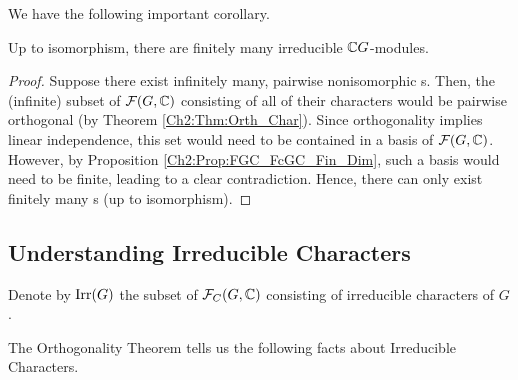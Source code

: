 We have the following important corollary.

\begin{corollary}
    Up to isomorphism, there are finitely many irreducible $\mathbb{C} G$-modules.
\end{corollary}
\begin{proof}
    Suppose there exist infinitely many, pairwise nonisomorphic \CGM s. Then, the (infinite) subset of $\mathcal{F}\!\left( G, \mathbb{C} \right)$ consisting of all of their characters would be pairwise orthogonal (by Theorem \ref{Ch2:Thm:Orth_Char}). Since orthogonality implies linear independence, this set would need to be contained in a basis of $\mathcal{F}\!\left( G, \mathbb{C} \right)$. However, by Proposition \ref{Ch2:Prop:FGC_FcGC_Fin_Dim}, such a basis would need to be finite, leading to a clear contradiction. Hence, there can only exist finitely many \CGM s (up to isomorphism).
\end{proof}

\subsection{Understanding Irreducible Characters}

\begin{boxnotation}
    Denote by $\operatorname{Irr}\!\left( G \right)$ the subset of $\mathcal{F}_C\!\left( G, \mathbb{C} \right)$ consisting of irreducible characters of $G$.
\end{boxnotation}

The Orthogonality Theorem tells us the following facts about Irreducible Characters.

